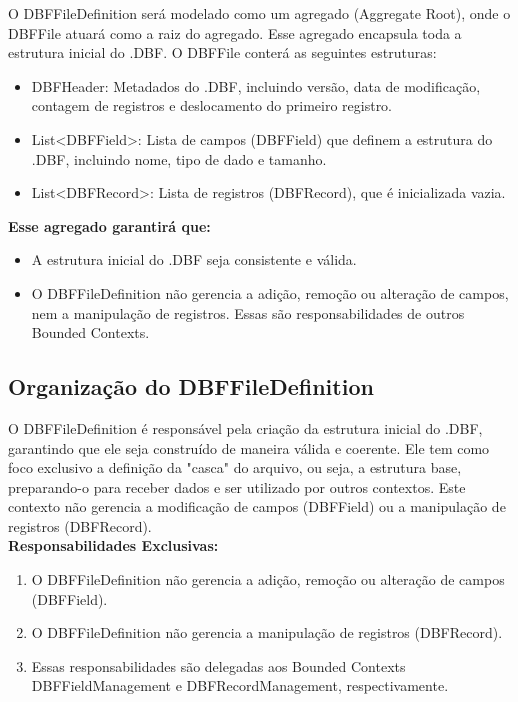 O DBFFileDefinition será modelado como um agregado (Aggregate Root), onde o DBFFile atuará como a raiz do agregado. Esse agregado encapsula toda a estrutura inicial do .DBF.
O DBFFile conterá as seguintes estruturas: 
\begin{itemize}
    \item DBFHeader: Metadados do .DBF, incluindo versão, data de modificação, contagem de registros e deslocamento do primeiro registro. \\
    \item List<DBFField>: Lista de campos (DBFField) que definem a estrutura do .DBF, incluindo nome, tipo de dado e tamanho. 
    \item List<DBFRecord>: Lista de registros (DBFRecord), que é inicializada vazia. 
\end{itemize}

\textbf{Esse agregado garantirá que:}
\begin{itemize}
    \item A estrutura inicial do .DBF seja consistente e válida.
    \item O DBFFileDefinition não gerencia a adição, remoção ou alteração de campos, nem a manipulação de registros. Essas são responsabilidades de outros Bounded Contexts.
\end{itemize}

\subsection{Organização do DBFFileDefinition}

O DBFFileDefinition é responsável pela criação da estrutura inicial do .DBF, garantindo que ele seja construído de maneira válida e coerente. Ele tem como foco exclusivo a definição da "casca" do arquivo, ou seja, a estrutura base, preparando-o para receber dados e ser utilizado por outros contextos. Este contexto não gerencia a modificação de campos (DBFField) ou a manipulação de registros (DBFRecord).\\

\textbf{Responsabilidades Exclusivas:} 

\begin{enumerate}
    \item O DBFFileDefinition não gerencia a adição, remoção ou alteração de campos (DBFField).
    \item O DBFFileDefinition não gerencia a manipulação de registros (DBFRecord).
    \item Essas responsabilidades são delegadas aos Bounded Contexts DBFFieldManagement e DBFRecordManagement, respectivamente.
\end{enumerate}

